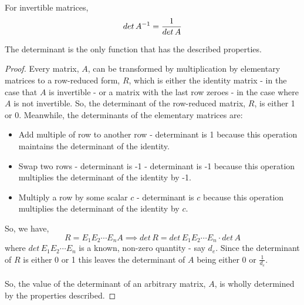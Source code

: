 \documentclass[MathsNotesBase.tex]{subfiles}
\begin{document}
{		\begin{corollary}
			For invertible matrices, \[ det\,{A}^{-1} = \frac{1}{det\,A} \]
		\end{corollary}
	
		\begin{corollary}
			The determinant is the only function that has the described properties.
		\end{corollary}
		\begin{proof}
			Every matrix, $A$, can be transformed by multiplication by elementary matrices to a row-reduced form, $R$, which is either the identity matrix - in the case that $A$ is invertible - or a matrix with the last row zeroes - in the case where $A$ is not invertible. So, the determinant of the row-reduced matrix, $R$, is either 1 or 0. Meanwhile, the determinants of the elementary matrices are:
			\begin{itemize}
				\item{Add multiple of row to another row}  - determinant is 1 because this operation maintains the determinant of the identity.
				\item{Swap two rows - determinant is -1} - determinant is -1 because this operation multiplies the determinant of the identity by -1.
				\item{Multiply a row by some scalar $c$}  - determinant is $c$ because this operation multiplies the determinant of the identity by $c$.
			\end{itemize}
			So, we have,
			\[ R = E_1E_2 \cdots E_nA \implies det\,R = det\,E_1E_2 \cdots E_n \cdot det\,A \]
			where $det\,E_1E_2 \cdots E_n$ is a known, non-zero quantity - say $d_e$. Since the determinant of $R$ is either 0 or 1 this leaves the determinant of $A$ being either 0 or $\frac{1}{d_e}$.
			\paragraph{}So, the value of the determinant of an arbitrary matrix, $A$, is wholly determined by the properties described.
		\end{proof}
	
}
\end{document}
